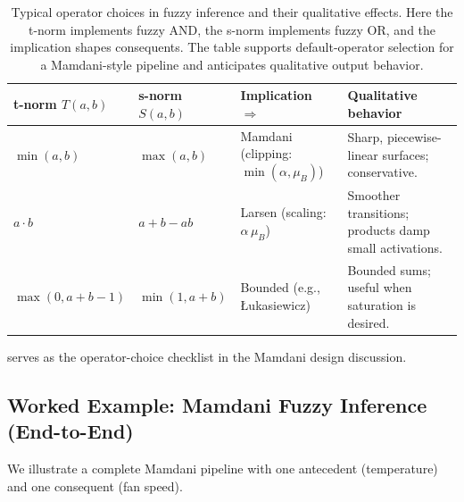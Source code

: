 \begin{table}[t]
\centering
\caption{Typical operator choices in fuzzy inference and their qualitative effects. Here the t\hyp{}norm implements fuzzy AND, the s\hyp{}norm implements fuzzy OR, and the implication shapes consequents. The table supports default-operator selection for a Mamdani-style pipeline and anticipates qualitative output behavior.}
\label{tab:fuzzy-operators}
\begin{tabularx}{\linewidth}{@{}>{\raggedright\arraybackslash}X>{\raggedright\arraybackslash}X>{\raggedright\arraybackslash}X>{\raggedright\arraybackslash}X@{}}
\toprule
t\hyp{}norm \(T(a, b)\) & s\hyp{}norm \(S(a, b)\) & Implication \(\Rightarrow\) & Qualitative behavior \\
\midrule
\(\min(a, b)\) & \(\max(a, b)\) & Mamdani (clipping: \(\min(\alpha,\mu_B)\)) & Sharp, piecewise-linear surfaces; conservative. \\
\(a\cdot b\) & \(a + b - ab\) & Larsen (scaling: \(\alpha\,\mu_B\)) & Smoother transitions; products damp small activations. \\
\(\max(0, a+b-1)\) & \(\min(1, a+b)\) & Bounded (e.g., {\L}ukasiewicz) & Bounded sums; useful when saturation is desired. \\
\bottomrule
\end{tabularx}
\end{table}

 serves as the operator-choice checklist in the Mamdani design discussion.

\subsection{Worked Example: Mamdani Fuzzy Inference (End-to-End)}
\label{sec:fuzzysets_worked_example_mamdani_fuzzy_inference_end_to_end}

We illustrate a complete Mamdani pipeline with one antecedent (temperature) and one consequent (fan speed).

